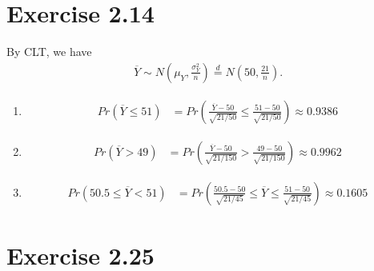 \documentclass[
]{book}
\begin{document}
\hypertarget{exercise-2.14}{%
\section{Exercise 2.14}\label{exercise-2.14}}

By CLT, we have
\begin{align}
    \overline{Y}
    \sim
    N\left(\mu_Y, \frac{\sigma_Y^2}{n}\right)
    \stackrel{d}{=}
    N\left(50, \frac{21}{n} \right).
\end{align}

\begin{enumerate}
\def\labelenumi{\alph{enumi}.}
\item
  \begin{align}
        Pr\left( \overline{Y}\leq 51 \right)
        & = Pr\left( \frac{\overline{Y} - 50}{\sqrt{21/50}} \leq \frac{51 - 50}{\sqrt{21/50}}\right) 
          \approx 0.9386
    \end{align}
\item
  \begin{align}
        Pr\left( \overline{Y} > 49 \right)
        & = Pr\left( \frac{\overline{Y} - 50}{\sqrt{21/150}} > \frac{49 - 50}{\sqrt{21/150}}\right) 
          \approx 0.9962
    \end{align}
\item
  \begin{align}
        Pr\left( 50.5 \leq \overline{Y} < 51 \right)
        & = Pr\left( \frac{50.5 - 50}{\sqrt{21/45}} \leq \overline{Y} \leq \frac{51 - 50}{\sqrt{21/45}}\right) 
          \approx 0.1605
    \end{align}
\end{enumerate}

\hypertarget{exercise-2.25}{%
\section{Exercise 2.25}\label{exercise-2.25}}
\end{document}
